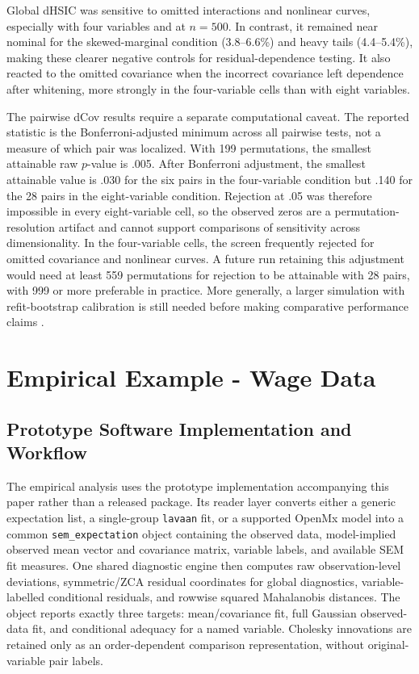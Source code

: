 \documentclass[floatsintext,a4paper]{apa7} %
\begin{document}
	Global dHSIC was sensitive to omitted interactions and nonlinear curves, especially with four variables and at $n=500$. In contrast, it remained near nominal for the skewed-marginal condition (3.8--6.6\%) and heavy tails (4.4--5.4\%), making these clearer negative controls for residual-dependence testing. It also reacted to the omitted covariance when the incorrect covariance left dependence after whitening, more strongly in the four-variable cells than with eight variables.
	
	The pairwise dCov results require a separate computational caveat. The reported statistic is the Bonferroni-adjusted minimum across all pairwise tests, not a measure of which pair was localized. With 199 permutations, the smallest attainable raw $p$-value is .005. After Bonferroni adjustment, the smallest attainable value is .030 for the six pairs in the four-variable condition but .140 for the 28 pairs in the eight-variable condition. Rejection at .05 was therefore impossible in every eight-variable cell, so the observed zeros are a permutation-resolution artifact and cannot support comparisons of sensitivity across dimensionality. In the four-variable cells, the screen frequently rejected for omitted covariance and nonlinear curves. A future run retaining this adjustment would need at least 559 permutations for rejection to be attainable with 28 pairs, with 999 or more preferable in practice. More generally, a larger simulation with refit-bootstrap calibration is still needed before making comparative performance claims \citep{bollen1992bootstrapping,pfister2018kernelbased}.
	
	\section{Empirical Example - Wage Data}
	
	\subsection{Prototype Software Implementation and Workflow}
	The empirical analysis uses the prototype implementation accompanying this paper rather than a released package. Its reader layer converts either a generic expectation list, a single-group \texttt{lavaan} fit, or a supported OpenMx model into a common \texttt{sem\_expectation} object containing the observed data, model-implied observed mean vector and covariance matrix, variable labels, and available SEM fit measures. One shared diagnostic engine then computes raw observation-level deviations, symmetric/ZCA residual coordinates for global diagnostics, variable-labelled conditional residuals, and rowwise squared Mahalanobis distances. The object reports exactly three targets: mean/covariance fit, full Gaussian observed-data fit, and conditional adequacy for a named variable. Cholesky innovations are retained only as an order-dependent comparison representation, without original-variable pair labels.
	
\end{document}
